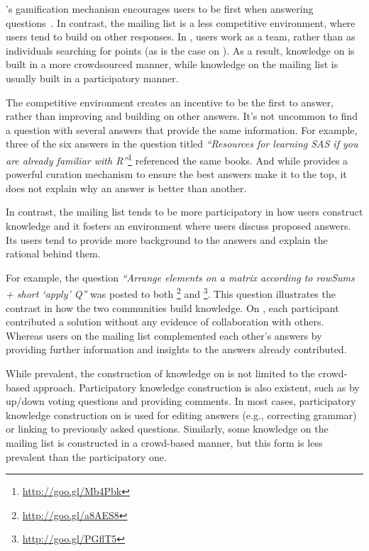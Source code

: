 \SO's gamification mechanism encourages users to be first when answering questions~\cite{Singer2013}. In contrast, the \RH mailing list is a less competitive
environment, where users tend to build on other responses. In \RH, users work as a team, rather than as individuals searching for points (as is the case on \SO).
As a result, knowledge on \SO is built in a more crowdsourced manner, while knowledge on the \RH mailing list is usually built in a participatory manner.

The competitive \SO environment creates an incentive to be the first to answer, rather than improving and building on other answers. It's not uncommon to find a question with several answers that provide the same information. For example, three of the six answers in the \SO question titled \textit{``Resources for learning SAS if you are already familiar with R''}\footnote{\url{http://goo.gl/Mb4Pbk}} referenced the same books.
And while \SO provides a powerful curation mechanism to ensure the best answers make it to the top, it does not explain why an answer is better than another.

In contrast, the \RH mailing list tends to be more participatory in how users construct knowledge and it fosters an environment where users discuss proposed answers. Its users tend to provide more background to the answers and explain the rational behind them.

For example, the question \textit{``Arrange elements on a matrix according to rowSums + short `apply' Q''} was posted to both \SO\footnote{\url{http://goo.gl/a8AES8}} and {\RH}\footnote{\url{http://goo.gl/PGflT5}}. This question illustrates the contrast in how the two communities build knowledge.
On \SO, each participant contributed a solution without any evidence of collaboration with others.
Whereas users on the \RH mailing list complemented each other's answers by providing further information and insights to the answers already contributed.
    
While prevalent, the construction of knowledge on \SO is not limited to the crowd-based approach. Participatory knowledge construction is also existent, such as by up/down voting questions and providing comments. In most cases, participatory knowledge construction on \SO is used for editing answers (e.g., correcting grammar) or linking to previously asked questions.
Similarly, some knowledge on the \RH mailing list is constructed in a crowd-based manner, but this form is less prevalent than the participatory one.

